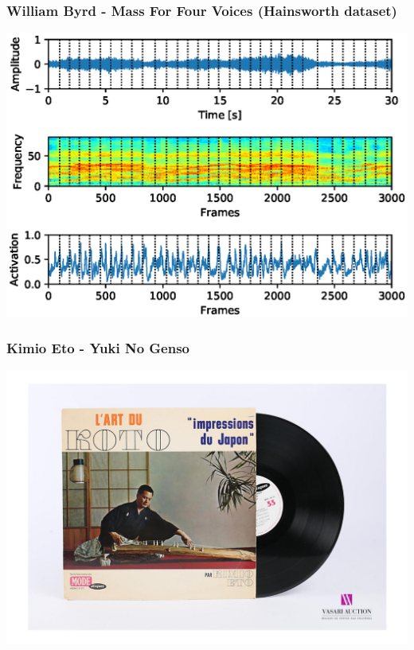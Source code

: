 \documentclass{beamer}
\begin{document}
\begin{frame}
\frametitle{William Byrd - Mass For Four Voices (Hainsworth dataset)}
\begin{minipage}{\textwidth} 
\centering
\includegraphics[scale=0.6]{figures/Tallis_Scholars.eps}
\end{minipage}
\end{frame}


\begin{frame}
\frametitle{Kimio Eto - Yuki No Genso}
\begin{minipage}{\textwidth} 
\centering
\includegraphics[width=\textwidth]{figures/l'art_du_koto.png}
\end{minipage}
\end{frame}
\end{document}
